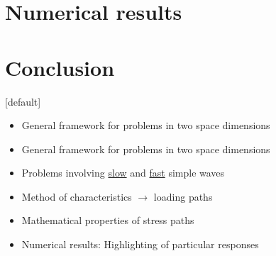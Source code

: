 \documentclass[11pt,aspectratio=169]{beamer}
\makeatletter
\newenvironment{withoutheadline}{
  \setbeamertemplate{headline}[default]
  \def\beamer@entrycode{\vspace*{-\headheight}}
}{}
\makeatother
\begin{document}
\section{Numerical results}




\section*{Conclusion}
\begin{withoutheadline}
\begin{frame}[standout]{}
  \begin{scriptsize}
    \begin{overprint}
      \vspace{-0.3cm}
      \begin{block}{\footnotesize {}}
        \vskip -6pt \begin{itemize}
        \item General framework for problems in two space dimensions
        \end{itemize}
      \end{block}
      \vspace{-0.3cm}
      \begin{block}{\footnotesize {}}
        \vskip -6pt \begin{itemize}
        \item General framework for problems in two space dimensions
        \end{itemize}
      \end{block}
      \vspace{-0.3cm}
      \begin{block}{\footnotesize {}}
        \vskip -6pt \begin{itemize}
        \item Problems involving \underline{slow} and \underline{fast} simple waves
        \item Method of characteristics $\rightarrow$ loading paths
        \item Mathematical properties of stress paths
        \item Numerical results: Highlighting of particular responses

\end{itemize}
\end{block}
\end{overprint}
\end{scriptsize}
\end{frame}
\end{withoutheadline}
\end{document}

